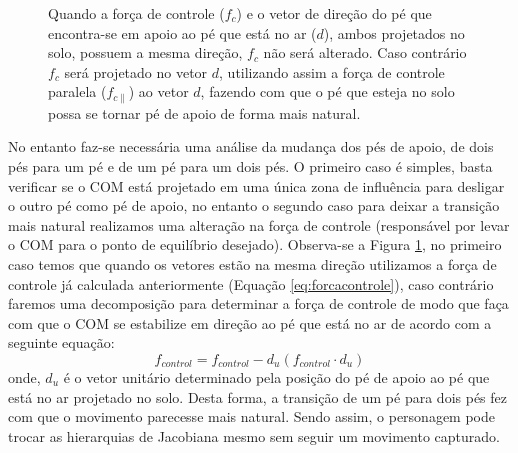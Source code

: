 \documentclass[tog]{acmsiggraph}
\begin{document}



\begin{figure}[!ht]
\centering
\def\svgwidth{\columnwidth}

\caption{Quando a força de controle ($f_{c}$) e o vetor de direção do pé que encontra-se em apoio ao pé que está
         no ar ($d$), ambos projetados no solo, possuem a mesma direção, $f_{c}$ não será alterado. Caso
         contrário $f_{c}$ será projetado no vetor ${d}$, utilizando assim a força de controle paralela ($f_{c \parallel}$) ao vetor $d$, fazendo com que o pé que esteja no solo possa
         se tornar pé de apoio de forma mais natural.}
\label{fig:umpeparadois}
\end{figure}



No entanto faz-se necessária uma análise da mudança dos pés de apoio, de dois pés para um pé e de um pé para um dois pés. 
O primeiro caso é simples, basta verificar se o COM está projetado em uma única zona de influência para desligar o outro pé
como pé de apoio, no entanto o segundo caso para deixar a transição mais natural realizamos uma alteração na força de controle
(responsável por levar o COM para o ponto de equilíbrio desejado). Observa-se a Figura \ref{fig:umpeparadois}, no primeiro caso temos
que quando os vetores estão na mesma direção utilizamos a força de controle já calculada anteriormente (Equação \ref{eq:forcacontrole}),
caso contrário faremos uma decomposição para determinar a força de controle de modo que faça com que o COM se estabilize em
direção ao pé que está no ar de acordo com a seguinte equação:
\begin{equation}
  f_{control} = f_{control} - {d}_{u} (f_{control} \cdot {d}_{u}) 
\end{equation}
\noindent onde, ${d}_{u}$ é o vetor unitário determinado pela posição do pé de apoio ao pé que está no ar projetado no solo. 
Desta forma, a transição de um pé para dois pés fez com que o movimento parecesse mais natural.
Sendo assim, o personagem pode trocar as hierarquias de Jacobiana mesmo sem seguir um movimento capturado.
\end{document}
